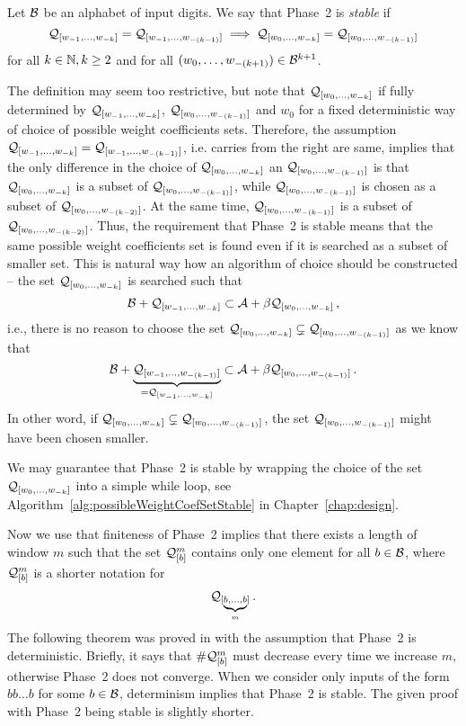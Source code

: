 \begin{defn}
Let $\mathcal{B}$ be an alphabet of input digits. We say that Phase~2 is \emph{stable} if 
$$
\mathcal{Q}_{[w_{-1}, \dots, w_{-k}]}=\mathcal{Q}_{[w_{-1}, \dots, w_{-(k-1)}]} \implies \mathcal{Q}_{[w_{0}, \dots, w_{-k}]}=\mathcal{Q}_{[w_{0}, \dots, w_{-(k-1)}]}
$$
for all $k\in\mathbb{N}, k\geq 2$ and for all $(w_{0}, \dots, w_{-(k+1)}) \in \mathcal{B}^{k+1}$.

\end{defn}
The definition may seem too restrictive, but note that $\mathcal{Q}_{[w_{0}, \dots, w_{-k}]}$ if fully determined by $\mathcal{Q}_{[w_{-1}, \dots, w_{-k}]}$, $\mathcal{Q}_{[w_{0}, \dots, w_{-(k-1)}]}$ and $w_0$ for a fixed deterministic way of choice of possible weight coefficients sets. Therefore, the assumption $\mathcal{Q}_{[w_{-1}, \dots, w_{-k}]}=\mathcal{Q}_{[w_{-1}, \dots, w_{-(k-1)}]}$, i.e. carries from the right are same, implies that the only difference in the choice of $\mathcal{Q}_{[w_{0}, \dots, w_{-k}]}$ an $\mathcal{Q}_{[w_{0}, \dots, w_{-(k-1)}]}$ is that $\mathcal{Q}_{[w_{0}, \dots, w_{-k}]}$ is a subset of  $\mathcal{Q}_{[w_{0}, \dots, w_{-(k-1)}]}$, while $\mathcal{Q}_{[w_{0}, \dots, w_{-(k-1)}]}$ is chosen as a subset of $\mathcal{Q}_{[w_{0}, \dots, w_{-(k-2)}]}$. At the same time, $\mathcal{Q}_{[w_{0}, \dots, w_{-(k-1)}]}$ is a subset of $\mathcal{Q}_{[w_{0}, \dots, w_{-(k-2)}]}$. Thus, the requirement that Phase~2 is stable means that the same possible weight coefficients set is found even if it is searched as a subset of smaller set. This is natural way how an algorithm of choice should be constructed -- the set $\mathcal{Q}_{[w_{0}, \dots, w_{-k}]}$ is searched such that
$$
\mathcal{B}+\mathcal{Q}_{[w_{-1}, \dots, w_{-k}]} \subset \mathcal{A}+\beta \mathcal{Q}_{[w_{0}, \dots, w_{-k}]}\,,
$$
i.e., there is no reason to choose the set $\mathcal{Q}_{[w_{0}, \dots, w_{-k}]}\subsetneq\mathcal{Q}_{[w_{0}, \dots, w_{-(k-1)}]}$ as we know that
$$
\mathcal{B}+\underbrace{\mathcal{Q}_{[w_{-1}, \dots, w_{-(k-1)}]}}_{=\mathcal{Q}_{[w_{-1}, \dots, w_{-k}]}} \subset \mathcal{A}+\beta \mathcal{Q}_{[w_{0}, \dots, w_{-(k-1)}]}\,.
$$
In other word, if $\mathcal{Q}_{[w_{0}, \dots, w_{-k}]}\subsetneq\mathcal{Q}_{[w_{0}, \dots, w_{-(k-1)}]}$, the set $\mathcal{Q}_{[w_{0}, \dots, w_{-(k-1)}]}$ might have been chosen smaller. 

We may guarantee that Phase~2 is stable by wrapping the choice of the set $\mathcal{Q}_{[w_{0}, \dots, w_{-k}]}$ into a simple while loop, see Algorithm~\ref{alg:possibleWeightCoefSetStable} in Chapter~\ref{chap:design}.

Now we use that finiteness of Phase~2 implies that there exists a length of window $m$ such that the set $\mathcal{Q}_{[\scriptstyle b]}^{\scriptstyle m}$ contains only one element for all $b\in\mathcal{B}$, where $\mathcal{Q}_{[\scriptstyle b]}^{\scriptstyle m}$ is a shorter notation for
$$
\mathcal{Q}_{[\underbrace{\scriptstyle b,\dots,b}_m]}\,.
$$
The following theorem was proved in \cite{vu} with the assumption that Phase~2 is deterministic. Briefly, it says that $\#\mathcal{Q}_{[\scriptstyle b]}^{\scriptstyle m}$ must decrease every time we increase $m$, otherwise Phase~2 does not converge. When we consider only inputs of the form $bb\dots b$ for some $b\in\mathcal{B}$, determinism implies that Phase~2 is stable. The given proof with Phase~2 being stable is slightly shorter.

